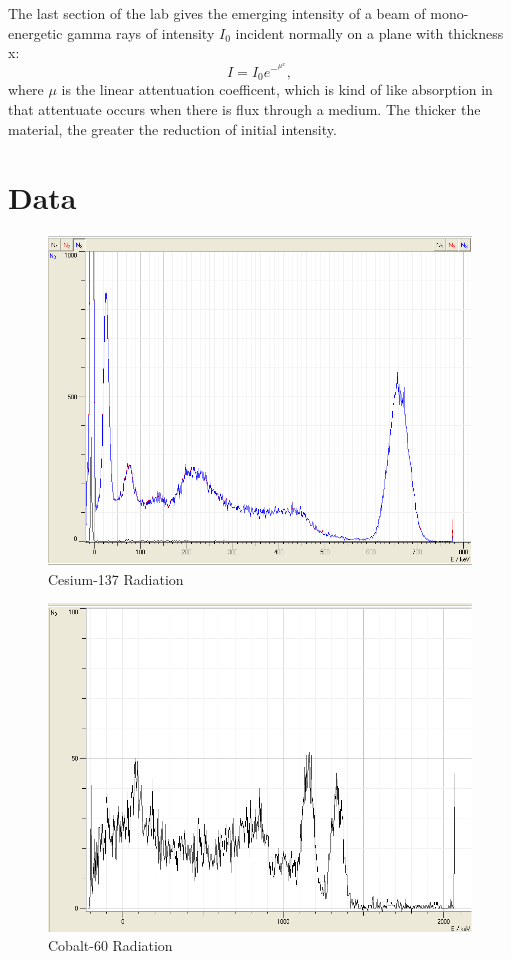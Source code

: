 \documentclass[12pt]{article}
\begin{document}
\indent The last section of the lab gives the emerging intensity of a beam of mono-energetic gamma rays of intensity $I_0$ incident normally on a plane with thickness x:
\[I = I_0 e^-^\mu^x , \]
\indent where $\mu$ is the linear attentuation coefficent, which is kind of like absorption in that attentuate occurs when there is flux through a medium. The thicker the material, the greater the reduction of initial intensity.

\section{Data}
\begin{figure}[H]
\centering
\hspace{-0.0in}\includegraphics[scale=0.60]{Plot1.png}
\caption{Cesium-137 Radiation \label{fig:setup}}
\end{figure}

\begin{figure}[H]
\centering
\hspace{-0.0in}\includegraphics[scale=0.60]{Plot2.png}
\caption{Cobalt-60 Radiation \label{fig:setup}}
\end{figure}
\end{document}
